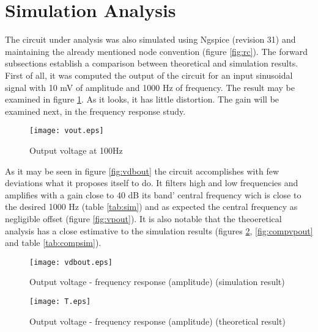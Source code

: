 \section{Simulation Analysis}
\label{sec:simulation}

The circuit under analysis was also simulated using Ngspice (revision 31) and maintaining the already mentioned node convention (figure \ref{fig:rc}). The forward subsections establish a comparison between theoretical and simulation results.
First of all, it was computed the output of the circuit for an input sinusoidal signal with 10 mV of amplitude and 1000 Hz of frequency. The result may be examined in figure \ref{fig:vout}. As it looks, it has little distortion. The gain will be examined next, in the frequency response study.



\begin{figure}[h] \centering
\texttt{[image: vout.eps]}%
\caption{Output voltage at 100Hz}
\label{fig:vout}
\end{figure}


As it may be seen in figure \ref{fig:vdbout} the circuit accomplishes with few deviations what it proposes itself to do. It filters high and low frequencies and amplifies with a gain close to 40 dB its band' central frequency wich is close to the desired 1000 Hz (table \ref{tab:sim}) and as expected the central frequency as negligible offset (figure \ref{fig:vpout}). It is also notable that the theoeretical analysis has a close estimative to the simulation  results (figures \ref{fig:compvdbout}, \ref{fig:compvpout} and table \ref{tab:compsim}).

\begin{figure}[h] \centering
  \begin{minipage}{.45\textwidth}
    \texttt{[image: vdbout.eps]}
    \caption{Output voltage - frequency response (amplitude) (simulation result)}
    \label{fig:vdbout}
  \end{minipage}%
    \hspace{2 mm}
  \begin{minipage}{.45\textwidth}
  \centering
    \texttt{[image: T.eps]}
    \caption{Output voltage - frequency response (amplitude) (theoretical result)}
    \label{fig:compvdbout}
      \end{minipage}%
\end{figure}


